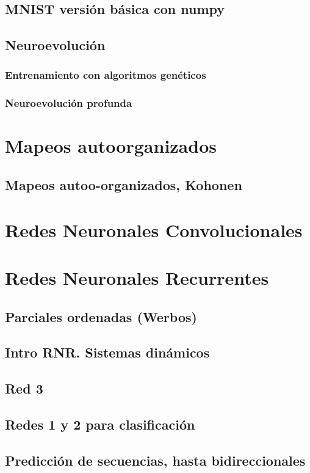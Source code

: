 \documentclass{article}
\begin{document}
\subsection{MNIST versión básica con numpy}
\subsection{Neuroevolución}
\subsubsection{Entrenamiento con algoritmos genéticos}
\subsubsection{Neuroevolución profunda}
\section{Mapeos autoorganizados}%
\subsection{Mapeos autoo-organizados, Kohonen}
\section{Redes Neuronales Convolucionales}%
\section{Redes Neuronales Recurrentes}%
\subsection{Parciales ordenadas (Werbos)}
\subsection{Intro RNR. Sistemas dinámicos}
\subsection{Red 3}
\subsection{Redes 1 y 2 para clasificación}
\subsection{Predicción de secuencias, hasta bidireccionales}
\end{document}
